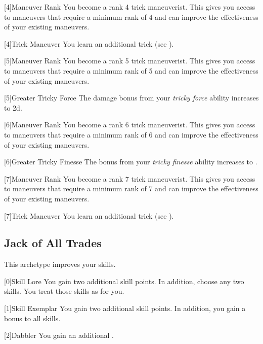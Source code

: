         {
            [4]{Maneuver Rank} You become a rank 4 trick maneuverist.
            This gives you access to maneuvers that require a minimum rank of 4 and can improve the effectiveness of your existing maneuvers.

            [4]{Trick Maneuver}
            You learn an additional trick  (see ).
        }

        {
            [5]{Maneuver Rank} You become a rank 5 trick maneuverist.
            This gives you access to maneuvers that require a minimum rank of 5 and can improve the effectiveness of your existing maneuvers.

            [5]{Greater Tricky Force} The damage bonus from your \textit{tricky force} ability increases to \plus2d.
        }

        {
            [6]{Maneuver Rank} You become a rank 6 trick maneuverist.
            This gives you access to maneuvers that require a minimum rank of 6 and can improve the effectiveness of your existing maneuvers.

            [6]{Greater Tricky Finesse} The bonus from your \textit{tricky finesse} ability increases to .
        }

        {
            [7]{Maneuver Rank} You become a rank 7 trick maneuverist.
            This gives you access to maneuvers that require a minimum rank of 7 and can improve the effectiveness of your existing maneuvers.

            [7]{Trick Maneuver}
            You learn an additional trick  (see ).
        }

    \newpage
    \subsection{Jack of All Trades}
        This archetype improves your skills.

        [0]{Skill Lore} You gain two additional skill points.
        In addition, choose any two skills.
        You treat those skills as  for you.

        [1]{Skill Exemplar} You gain two additional skill points.
        In addition, you gain a  bonus to all skills.

        [2]{Dabbler} You gain an additional .

